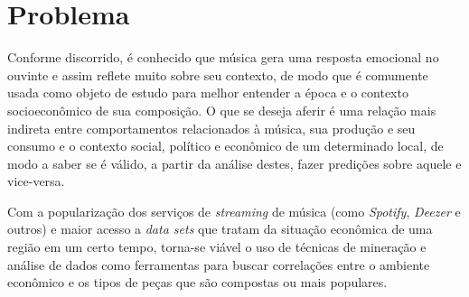 \chapter{Problema}
\label{c.problema}

Conforme discorrido, é conhecido que música gera uma resposta emocional no ouvinte e assim reflete muito sobre seu contexto, de modo que é comumente usada como objeto de estudo para melhor entender a época e o contexto socioeconômico de sua composição. O que se deseja aferir é uma relação mais indireta entre comportamentos relacionados à música, sua produção e seu consumo e o contexto social, político e econômico de um determinado local, de modo a saber se é válido, a partir da análise destes, fazer predições sobre aquele e vice-versa.
    
Com a popularização dos serviços de \textit{streaming} de música (como \textit{Spotify}, \textit{Deezer} e outros) e maior acesso a \textit{data sets} que tratam da situação econômica de uma região em um certo tempo, torna-se viável o uso de técnicas de mineração e análise de dados como ferramentas para buscar correlações entre o ambiente econômico e os tipos de peças que são compostas ou mais populares.